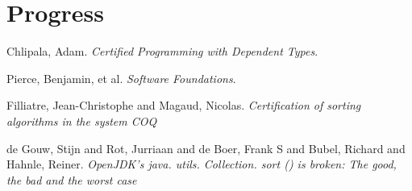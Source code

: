 \documentclass{article}
\begin{document}
\section{Progress}


\begin{thebibliography}{xx}
    Chlipala, Adam. \emph{Certified Programming with Dependent Types}.

    Pierce, Benjamin, et al. \emph{Software Foundations}.

    Filliatre, Jean-Christophe and Magaud, Nicolas. \emph{Certification of
    sorting algorithms in the system COQ}

    de Gouw, Stijn and Rot, Jurriaan and de Boer, Frank S and Bubel, Richard
    and Hahnle, Reiner. \emph{OpenJDK's java. utils. Collection. sort () is
    broken: The good, the bad and the worst case}
\end{thebibliography}
\end{document}
